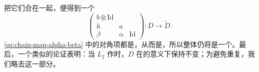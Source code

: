 把它们合在一起，便得到一个\trChainMap
\begin{equation}\label{eq:chain-map-alpha-beta}
\begin{pmatrix}
b\otimes\mathrm{Id} & & \\
h & a & \\
\beta & \alpha & \mathrm{Id}
\end{pmatrix}
\colon D\longrightarrow\tilde{D}.
\end{equation}
\eqref{eq:chain-map-alpha-beta} 中的对角项都是\trContinuationMap，从而是\trQuasiisomorphism，所以整体仍将是一个\trQuasiisomorphism。最后，一个类似的论证表明：当 $L_2$ 作\trIsotopy{}时，$D$ 在\trQuasiisomorphic{}的意义下保持不变；为避免重复，我们略去这一部分。
